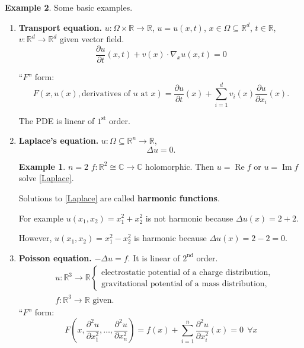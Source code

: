 \documentclass[12pt]{article}
\DeclareMathOperator{\Real}{Re}
\DeclareMathOperator{\Img}{Im}
\theoremstyle{definition}
\newtheorem*{example*}{Example}
\begin{document}
\begin{example*}
Some basic examples.

\begin{enumerate}[label=\alph*)]
\item \textbf{Transport equation.} $u:\Omega\times\mathbb R\rightarrow\mathbb R$, $u=u(x,t)$, $x\in\Omega\subseteq\mathbb R^d$, $t\in\mathbb R$, $v:\mathbb R^d\rightarrow\mathbb R^d$ given vector field.
\[\frac{\partial u}{\partial t}(x,t)+v(x)\cdot\nabla_xu(x,t)=0\]

``$F$'' form:
\[F(x,u(x),\text{derivatives of }u\text{ at }x)=\frac{\partial u}{\partial t}(x)+\sum_{i=1}^dv_i(x)\frac{\partial u}{\partial x_i}(x).\]

The PDE is linear of $1^\text{st}$ order.

\item \textbf{Laplace's equation.} $u:\Omega\subseteq\mathbb R^n\rightarrow\mathbb R$,
\begin{equation}\tag{1}\label{Laplace}
\Delta u=0.
\end{equation}

\begin{example*}
$n=2$ $f:\mathbb R^2\cong\mathbb C\rightarrow\mathbb C$ holomorphic. Then $u=\Real f$ or $u=\Img f$ solve \eqref{Laplace}.
\end{example*}

Solutions to \eqref{Laplace} are called \textbf{harmonic functions}.

For example $u(x_1,x_2)=x_1^2+x_2^2$ is not harmonic because $\Delta u(x)=2+2$.

However, $u(x_1,x_2)=x_1^2-x_2^2$ is harmonic because $\Delta u(x)=2-2=0$.

\item \textbf{Poisson equation.} $-\Delta u=f$. It is linear of $2^\text{nd}$ order.
\begin{align*}
&u:\mathbb R^3\longrightarrow\mathbb R\left\{\begin{array}{l}\text{electrostatic potential of a charge distribution},\\\text{gravitational potential of a mass distribution},\end{array}\right.\\
&f:\mathbb R^3\longrightarrow\mathbb R\text{ given}.
\end{align*}
``$F$'' form:
\[F\left(x,\frac{\partial^2u}{\partial x_1^2},\ldots,\frac{\partial^2u}{\partial x_n^2}\right)=f(x)+\sum_{i=1}^n\frac{\partial^2u}{\partial x_i^2}(x)=0\ \ \forall x\]


\end{enumerate}
\end{example*}
\end{document}
